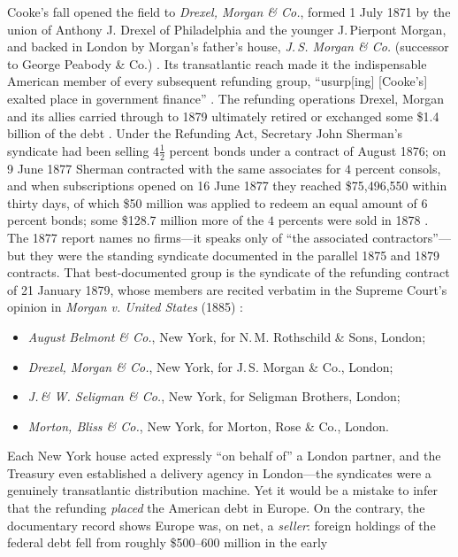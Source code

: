 \documentclass[12pt]{article}
\begin{document}
Cooke's fall opened the field to \emph{Drexel, Morgan \& Co.}, formed 1 July
1871 by the union of Anthony J. Drexel of Philadelphia and the younger
J.\,Pierpont Morgan, and backed in London by Morgan's father's house, \emph{J.\,S.
Morgan \& Co.} (successor to George Peabody \& Co.)
\citep[22--29]{carosso1970investment}. Its transatlantic reach made it the
indispensable American member of every subsequent refunding group, ``usurp[ing]
[Cooke's] exalted place in government finance'' \citep[35--37]{chernow1990house}.
The refunding operations Drexel, Morgan and its allies carried through to 1879
ultimately retired or exchanged some \$1.4 billion of the debt
\citep[176--199]{carosso1987morgans}. Under the Refunding Act, Secretary
John Sherman's syndicate had been selling $4\tfrac{1}{2}$ percent bonds under a
contract of August 1876; on 9 June 1877 Sherman contracted with the same
associates for $4$ percent consols, and when subscriptions opened on 16 June
1877 they reached \$75{,}496{,}550 within thirty days, of which \$50 million was
applied to redeem an equal amount of $6$ percent bonds; some \$128.7 million more
of the $4$ percents were sold in 1878 \citep{treasury1877}. The 1877 report names
no firms---it speaks only of ``the associated contractors''---but they were the
standing syndicate documented in the parallel 1875 and 1879 contracts. That
best-documented group is the syndicate of the
refunding contract of 21 January 1879, whose members are recited verbatim in the
Supreme Court's opinion in \emph{Morgan v. United States} (1885)
\citep{morgan1885}:
\begin{itemize}
\item \emph{August Belmont \& Co.}, New York, for N.\,M. Rothschild \& Sons, London;
\item \emph{Drexel, Morgan \& Co.}, New York, for J.\,S. Morgan \& Co., London;
\item \emph{J.\,\& W. Seligman \& Co.}, New York, for Seligman Brothers, London;
\item \emph{Morton, Bliss \& Co.}, New York, for Morton, Rose \& Co., London.
\end{itemize}
Each New York house acted expressly ``on behalf of'' a London partner, and the
Treasury even established a delivery agency in London---the syndicates were a
genuinely transatlantic distribution machine. Yet it would be a mistake to infer
that the refunding \emph{placed} the American debt in Europe. On the contrary,
the documentary record shows Europe was, on net, a \emph{seller}: foreign
holdings of the federal debt fell from roughly \$500--600 million in the early
\end{document}
